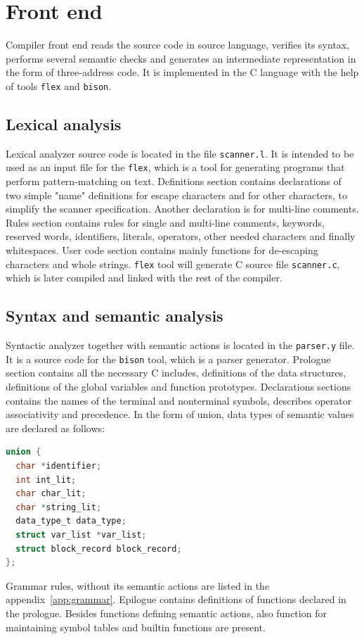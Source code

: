 \documentclass[a4paper]{article}[25.12.2015]
\begin{document}


\section{Front end}
Compiler front end reads the source code in source language, verifies its syntax, performs several semantic checks and generates an intermediate representation in the form of three-address code.
It is implemented in the C language with the help of tools \texttt{flex} and \texttt{bison}.
\subsection*{Lexical analysis}
Lexical analyzer source code is located in the file \texttt{scanner.l}.
It is intended to be used as an input file for the \texttt{flex}, which is a tool for generating programs that perform pattern-matching on text.
Definitions section contains declarations of two simple "name" definitions for escape characters and for other characters, to simplify the scanner specification.
Another declaration is for multi-line comments.
Rules section contains rules for single and multi-line comments, keywords, reserved words, identifiers, literals, operators, other needed characters and finally whitespaces.
User code section contains mainly functions for de-escaping characters and whole strings.
\texttt{flex} tool will generate C source file \texttt{scanner.c}, which is later compiled and linked with the rest of the compiler.

\subsection*{Syntax and semantic analysis}
Syntactic analyzer together with semantic actions is located in the \texttt{parser.y} file.
It is a source code for the \texttt{bison} tool, which is a parser generator.
Prologue section contains all the necessary C includes, definitions of the data structures, definitions of the global variables and function prototypes.
Declarations sections contains the names of the terminal and nonterminal symbols, describes operator associativity and precedence.
In the form of union, data types of semantic values are declared as follows:
\begin{lstlisting}[language=C]
union {
  char *identifier;
  int int_lit;
  char char_lit;
  char *string_lit;
  data_type_t data_type;
  struct var_list *var_list;
  struct block_record block_record;
};
\end{lstlisting}
Grammar rules, without its semantic actions are listed in the appendix~\ref{app:grammar}.
Epilogue contains definitions of functions declared in the prologue.
Besides functions defining semantic actions, also function for maintaining symbol tables and builtin functions are present.
\end{document}
